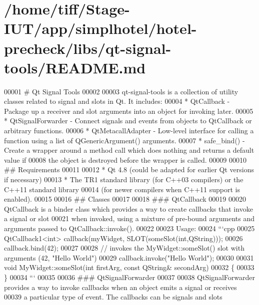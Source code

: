 \hypertarget{libs_2qt-signal-tools_2README_8md_source}{\section{/home/tiff/\-Stage-\/\-I\-U\-T/app/simplhotel/hotel-\/precheck/libs/qt-\/signal-\/tools/\-R\-E\-A\-D\-M\-E.md}
}

\begin{DoxyCode}
00001 \textcolor{preprocessor}{# Qt Signal Tools}
00002 \textcolor{preprocessor}{}
00003 qt-signal-tools is a collection of utility classes related to signal and slots in Qt.  It includes:
00004  * QtCallback - Package up a receiver and slot arguments into an \textcolor{keywordtype}{object} \textcolor{keywordflow}{for} invoking later.
00005  * QtSignalForwarder - Connect signals and events from objects to QtCallback or arbitrary functions.
00006  * QtMetacallAdapter - Low-level \textcolor{keyword}{interface }for calling a function using a list of QGenericArgument() 
      arguments.
00007  * safe\_bind() - Create a wrapper around a method call which does nothing and returns a \textcolor{keywordflow}{default} value \textcolor{keywordflow}{if}
00008   the \textcolor{keywordtype}{object} is destroyed before the wrapper is called.
00009 
00010 ## Requirements
00011 
00012  * Qt 4.8 (could be adapted \textcolor{keywordflow}{for} earlier Qt versions \textcolor{keywordflow}{if} necessary)
00013  * The TR1 standard library (\textcolor{keywordflow}{for} C++03 compilers) or the C++11 standard library
00014   (\textcolor{keywordflow}{for} newer compilers when C++11 support is enabled).
00015 
00016 ## Classes
00017 
00018 \textcolor{preprocessor}{### QtCallback}
00019 \textcolor{preprocessor}{}
00020 QtCallback is a binder \textcolor{keyword}{class }which provides a way to create callbacks that invoke a signal or slot
00021 when invoked, using a mixture of pre-bound arguments and arguments passed to QtCallback::invoke().
00022 
00023 Usage:
00024 ```cpp
00025 QtCallback1<int> callback(myWidget, SLOT(someSlot(int,QString)));
00026 callback.bind(42);
00027 
00028 \textcolor{comment}{// invokes the MyWidget::someSlot() slot with arguments (42, "Hello World")}
00029 callback.invoke("Hello World");
00030 
00031 void MyWidget::someSlot(int firstArg, const QString& secondArg)
00032 \{
00033 \}
00034 ```
00035 
00036 \textcolor{preprocessor}{### QtSignalForwarder}
00037 \textcolor{preprocessor}{}
00038 QtSignalForwarder provides a way to invoke callbacks when an \textcolor{keywordtype}{object} emits a signal or receives
00039 a particular type of \textcolor{keyword}{event}.  The callbacks can be signals and slots

\end{DoxyCode}
